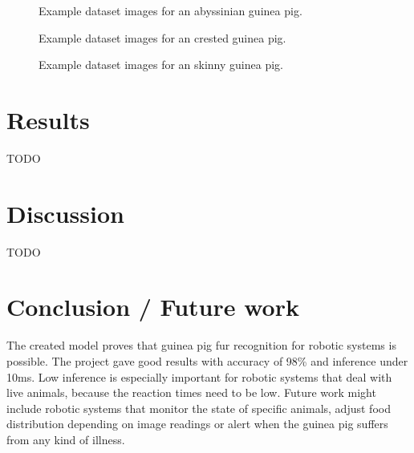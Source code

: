 \documentclass[10pt,journal,compsoc]{IEEEtran}
\begin{document}
    \begin{figure}[h]
        \caption{Example dataset images for an abyssinian guinea pig.}
        \label{fig:abyssinian}
        \centering
    \end{figure}

    \begin{figure}[h]
        \caption{Example dataset images for an crested guinea pig.}
        \label{fig:crested}
        \centering
    \end{figure}

    \begin{figure}[h]
        \caption{Example dataset images for an skinny guinea pig.}
        \label{fig:skinny}
        \centering
    \end{figure}
    
    \section{Results}
    TODO
    
    \section{Discussion}
    TODO
    
    \section{Conclusion / Future work}
    The created model proves that guinea pig fur recognition for robotic systems is possible. The project gave good results with accuracy of 98\% and inference under 10ms. Low inference is especially important for robotic systems that deal with live animals, because the reaction times need to be low. \newline\newline
    Future work might include robotic systems that monitor the state of specific animals, adjust food distribution depending on image readings or alert when the guinea pig suffers from any kind of illness.
    
   
   
    
    
\end{document}
